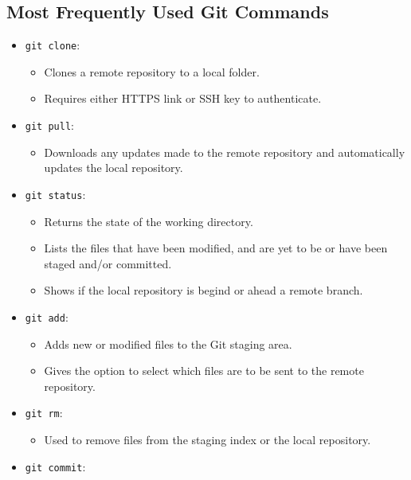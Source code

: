 \documentclass[
]{book}
\providecommand{\tightlist}{%
  \setlength{\itemsep}{0pt}\setlength{\parskip}{0pt}}
\theoremstyle{definition}
\theoremstyle{definition}
\theoremstyle{definition}
\theoremstyle{definition}
\theoremstyle{remark}
\begin{document}
\subsection{Most Frequently Used Git Commands}\label{most-frequently-used-git-commands}

\begin{itemize}
\tightlist
\item
  \texttt{git\ clone}:

  \begin{itemize}
  \tightlist
  \item
    Clones a remote repository to a local folder.
  \item
    Requires either HTTPS link or SSH key to authenticate.
  \end{itemize}
\item
  \texttt{git\ pull}:

  \begin{itemize}
  \tightlist
  \item
    Downloads any updates made to the remote repository and automatically updates the local repository.
  \end{itemize}
\item
  \texttt{git\ status}:

  \begin{itemize}
  \tightlist
  \item
    Returns the state of the working directory.
  \item
    Lists the files that have been modified, and are yet to be or have been staged and/or committed.
  \item
    Shows if the local repository is begind or ahead a remote branch.
  \end{itemize}
\item
  \texttt{git\ add}:

  \begin{itemize}
  \tightlist
  \item
    Adds new or modified files to the Git staging area.
  \item
    Gives the option to select which files are to be sent to the remote repository.
  \end{itemize}
\item
  \texttt{git\ rm}:

  \begin{itemize}
  \tightlist
  \item
    Used to remove files from the staging index or the local repository.
  \end{itemize}
\item
  \texttt{git\ commit}:


\end{itemize}
\end{document}

